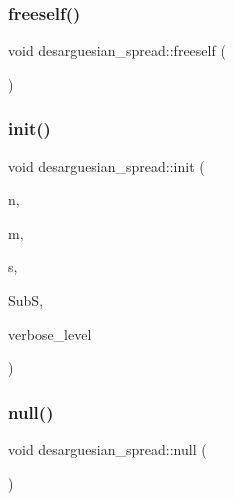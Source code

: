 \mbox{\label{classdesarguesian__spread_a2a3ae6452c76199aeb316fec8a8fa14a}} 
\subsubsection{\texorpdfstring{freeself()}{freeself()}}
{\footnotesize\ttfamily void desarguesian\+\_\+spread\+::freeself (\begin{DoxyParamCaption}{ }\end{DoxyParamCaption})}

\mbox{\label{classdesarguesian__spread_a6729ce39e1af501df742b194deb98165}} 
\subsubsection{\texorpdfstring{init()}{init()}}
{\footnotesize\ttfamily void desarguesian\+\_\+spread\+::init (\begin{DoxyParamCaption}\item[{\mbox{\hyperlink{galois_8h_a09fddde158a3a20bd2dcadb609de11dc}{I\+NT}}}]{n,  }\item[{\mbox{\hyperlink{galois_8h_a09fddde158a3a20bd2dcadb609de11dc}{I\+NT}}}]{m,  }\item[{\mbox{\hyperlink{galois_8h_a09fddde158a3a20bd2dcadb609de11dc}{I\+NT}}}]{s,  }\item[{\mbox{\hyperlink{classsubfield__structure}{subfield\+\_\+structure}} $\ast$}]{SubS,  }\item[{\mbox{\hyperlink{galois_8h_a09fddde158a3a20bd2dcadb609de11dc}{I\+NT}}}]{verbose\+\_\+level }\end{DoxyParamCaption})}

\mbox{\label{classdesarguesian__spread_a344fe2b921d6dfc533a7f6b2c6ec92b9}} 
\subsubsection{\texorpdfstring{null()}{null()}}
{\footnotesize\ttfamily void desarguesian\+\_\+spread\+::null (\begin{DoxyParamCaption}{ }\end{DoxyParamCaption})}

